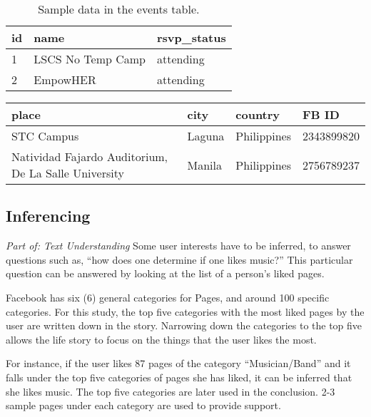 \begin{table}[ph!]   %
\centering
\caption{Sample data in the events table.} \vspace{0.25em}
\begin{tabular}{|p{1.5cm}|p{3in}|p{1in}|} \hline
\textbf{id} & \textbf{name} & \textbf{rsvp\_status} \\ \hline
1 & LSCS No Temp Camp &  attending \\ \hline
2 & EmpowHER & attending \\ \hline
\end{tabular}
\label{tab:events1}
\end{table}

\begin{table}[ph!]
\centering
\begin{tabular}{|p{2in}|p{1in}|p{1in}|p{1in}|} \hline
\textbf{place} & \textbf{city} & \textbf{country} & \textbf{FB ID} \\ \hline
STC Campus& Laguna& Philippines& 2343899820\\ \hline
Natividad Fajardo Auditorium, De La Salle University & Manila& Philippines& 2756789237 \\ \hline
\end{tabular}
\end{table}

\subsection{Inferencing}
\textit{Part of: Text Understanding} \newline \newline
Some user interests have to be inferred, to answer questions such as, ``how does one determine if one likes music?'' This particular question can be answered by looking at the list of a person's liked pages.

Facebook has six (6) general categories for Pages, and around 100 specific categories. For this study, the top five categories with the most liked pages by the user are written down in the story. Narrowing down the categories to the top five allows the life story to focus on the things that the user likes the most.

For instance, if the user likes 87 pages of the category ``Musician/Band'' and it falls under the top five categories of pages she has liked, it can be inferred that she likes music. The top five categories are later used in the conclusion. 2-3 sample pages under each category are used to provide support.

